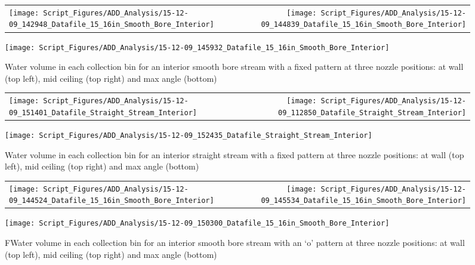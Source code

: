 \documentclass{article}
\begin{document}
\begin{figure}[ht]
\begin{tabular*}{\textwidth}{lr}
\texttt{[image: Script\_Figures/ADD\_Analysis/15-12-09\_142948\_Datafile\_15\_16in\_Smooth\_Bore\_Interior]} &
\texttt{[image: Script\_Figures/ADD\_Analysis/15-12-09\_144839\_Datafile\_15\_16in\_Smooth\_Bore\_Interior]} \\
\end{tabular*}
\centering
\texttt{[image: Script\_Figures/ADD\_Analysis/15-12-09\_145932\_Datafile\_15\_16in\_Smooth\_Bore\_Interior]}
\caption{Water volume in each collection bin for an interior smooth bore stream with a fixed pattern at three nozzle positions: at wall (top left), mid ceiling (top right) and max angle (bottom)}
\label{fig:Interior_Varying_Nozzle_Direction_SB_Fixed_Pattern}
\end{figure}

\begin{figure}[ht]
\begin{tabular*}{\textwidth}{lr}
\texttt{[image: Script\_Figures/ADD\_Analysis/15-12-09\_151401\_Datafile\_Straight\_Stream\_Interior]} &
\texttt{[image: Script\_Figures/ADD\_Analysis/15-12-09\_112850\_Datafile\_Straight\_Stream\_Interior]} \\
\end{tabular*}
\centering
\texttt{[image: Script\_Figures/ADD\_Analysis/15-12-09\_152435\_Datafile\_Straight\_Stream\_Interior]}
\caption{Water volume in each collection bin for an interior straight stream with a fixed pattern at three nozzle positions: at wall (top left), mid ceiling (top right) and max angle (bottom)}
\label{fig:Interior_Varying_Nozzle_Direction_SS_Fixed_Pattern}
\end{figure}

\begin{figure}[ht]
\begin{tabular*}{\textwidth}{lr}
\texttt{[image: Script\_Figures/ADD\_Analysis/15-12-09\_144524\_Datafile\_15\_16in\_Smooth\_Bore\_Interior]} &
\texttt{[image: Script\_Figures/ADD\_Analysis/15-12-09\_145534\_Datafile\_15\_16in\_Smooth\_Bore\_Interior]} \\
\end{tabular*}
\centering
\texttt{[image: Script\_Figures/ADD\_Analysis/15-12-09\_150300\_Datafile\_15\_16in\_Smooth\_Bore\_Interior]}
\caption{FWater volume in each collection bin for an interior smooth bore stream with an `o' pattern at three nozzle positions: at wall (top left), mid ceiling (top right) and max angle (bottom)}
\label{fig:Interior_Varying_Nozzle_Direction_SB_O_Pattern}
\end{figure}
\end{document}
